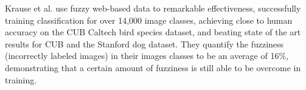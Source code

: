Krause et al. use fuzzy web-based data to remarkable effectiveness, successfully training classification for over 14,000 image classes, achieving close to human accuracy on the CUB Caltech bird species dataset, and beating state of the art results for CUB and the Stanford dog dataset\cite{krause2016unreasonable}. They quantify the fuzziness (incorrectly labeled images) in their images classes to be an average of 16\%, demonstrating that a certain amount of fuzziness is still able to be overcome in training. 

